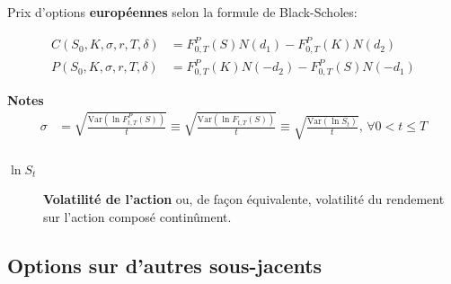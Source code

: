 \documentclass[10pt, french]{article}
\begin{document}
\begin{multicols*}{2}
\begin{definitionNOHFILL}
Prix d'options \textbf{européennes} selon la formule de Black-Scholes:

\begin{align*}
	C(S_{0}, K, \sigma, r, T, \delta)
	&=	F^{P}_{0, T}(S) N(d_{1}) - F^{P}_{0, T}(K) N(d_{2})	\\
	P(S_{0}, K, \sigma, r, T, \delta)
	&=	F^{P}_{0, T}(K) N(-d_{2}) - F^{P}_{0, T}(S) N(-d_{1})	
\end{align*}

\tcbline
\textbf{Notes}
\begin{align*}
	\sigma
	&=	\sqrt{\frac{\text{Var}(\ln F^{P}_{t, T}(S))}{t}}	
	\equiv	\sqrt{\frac{\text{Var}(\ln F_{t, T}(S))}{t}}	
	\equiv	\sqrt{\frac{\text{Var}(\ln S_{t})}{t}}, \, \forall 0 < t \le T	\\
\end{align*}

\begin{description}
	\item[$\ln S_{t}$]	\textbf{Volatilité de l'action} ou, de façon équivalente, volatilité du rendement sur l'action composé continûment.
\end{description}
\end{definitionNOHFILL}


\subsection{Options sur d'autres sous-jacents}


\end{multicols*}
\end{document}
